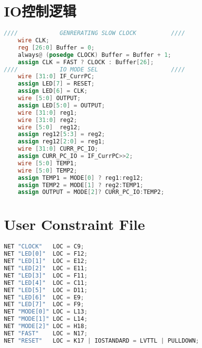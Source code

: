 \documentclass[a4paper]{article}
\begin{document}
\newpage
\section{IO控制逻辑}
    \begin{lstlisting}[language={Verilog},title={IO.v}]
////            GENRERATING SLOW CLOCK          ////
	wire CLK;
	reg [26:0] Buffer = 0;
	always@ (posedge CLOCK) Buffer = Buffer + 1;
	assign CLK = FAST ? CLOCK : Buffer[26];
////            IO MODE SEL                     ////
	wire [31:0] IF_CurrPC;
	assign LED[7] = RESET;
	assign LED[6] = CLK;
	wire [5:0] OUTPUT;
	assign LED[5:0] = OUTPUT;
	wire [31:0] reg1;
	wire [31:0] reg2;
	wire [5:0]  reg12;
	assign reg12[5:3] = reg2;
	assign reg12[2:0] = reg1;
	wire [31:0] CURR_PC_IO;
	assign CURR_PC_IO = IF_CurrPC>>2;
	wire [5:0] TEMP1;
	wire [5:0] TEMP2;
	assign TEMP1 = MODE[0] ? reg1:reg12;
	assign TEMP2 = MODE[1] ? reg2:TEMP1;
	assign OUTPUT = MODE[2]? CURR_PC_IO:TEMP2;   \end{lstlisting}
\section{User Constraint File}
    \begin{lstlisting}[language={Verilog},title={top.ucf}]
NET "CLOCK"   LOC = C9;
NET "LED[0]"  LOC = F12;
NET "LED[1]"  LOC = E12;
NET "LED[2]"  LOC = E11;
NET "LED[3]"  LOC = F11;
NET "LED[4]"  LOC = C11;
NET "LED[5]"  LOC = D11;
NET "LED[6]"  LOC = E9;
NET "LED[7]"  LOC = F9;
NET "MODE[0]" LOC = L13;
NET "MODE[1]" LOC = L14;
NET "MODE[2]" LOC = H18;
NET "FAST" 	  LOC = N17;
NET "RESET"   LOC = K17 | IOSTANDARD = LVTTL | PULLDOWN;  \end{lstlisting}
\end{document}
